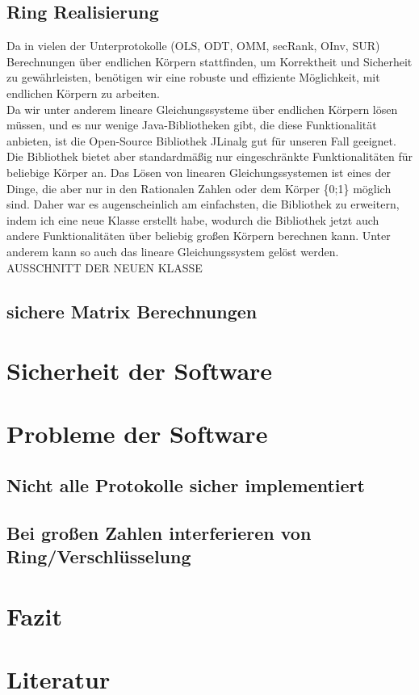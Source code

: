 \documentclass[a4paper,10pt]{scrartcl}
\begin{document}
\subsection{Ring Realisierung}
Da in vielen der Unterprotokolle (OLS, ODT, OMM, secRank, OInv, SUR) Berechnungen über endlichen Körpern stattfinden, um Korrektheit und Sicherheit zu gewährleisten, benötigen wir eine robuste und effiziente Möglichkeit, mit endlichen Körpern zu arbeiten.\\
Da wir unter anderem lineare Gleichungssysteme über endlichen Körpern lösen müssen, und es nur wenige Java-Bibliotheken gibt, die diese Funktionalität anbieten, ist die Open-Source Bibliothek JLinalg \cite{JLinAlg} gut für unseren Fall geeignet. Die Bibliothek bietet aber standardmäßig nur eingeschränkte Funktionalitäten für beliebige Körper an. Das Lösen von linearen Gleichungssystemen ist eines der Dinge, die aber nur in den  Rationalen Zahlen oder dem Körper \{0;1\} möglich sind. Daher war es augenscheinlich am einfachsten, die Bibliothek zu erweitern, indem ich eine neue Klasse erstellt habe, wodurch die Bibliothek jetzt auch andere Funktionalitäten über beliebig großen Körpern berechnen kann. Unter anderem kann so auch das lineare Gleichungssystem gelöst werden.\\

AUSSCHNITT DER NEUEN KLASSE



\subsection{sichere Matrix Berechnungen}

\section{Sicherheit der Software}

\section{Probleme der Software}
\subsection{Nicht alle Protokolle sicher implementiert}
\subsection{Bei großen Zahlen interferieren von Ring/Verschlüsselung}

\section{Fazit}
\section{Literatur}

\end{document}
